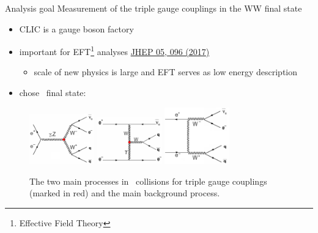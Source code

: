 \documentclass{beamer}
\begin{document}
\begin{frame}{Analysis goal}
Measurement of the triple gauge couplings in the WW final state
\begin{itemize}
%
  \item CLIC is a gauge boson factory
  \item important for EFT\footnote{Effective Field Theory} analyses \href{https://link.springer.com/content/pdf/10.1007/JHEP05(2017)096.pdf}{JHEP 05, 096 (2017)}
  \begin{itemize}
    \item scale of new physics is large and EFT serves as low energy description
  \end{itemize}
  \item chose \qqln\ final state:
%
\end{itemize}

\begin{figure}
\includegraphics[width=0.25\textwidth]{triple_gauge_s_chan.png} \hspace{1em}
\includegraphics[width=0.25\textwidth]{triple_gauge_t_chan.png} \hspace{1em}
\includegraphics[width=0.25\textwidth]{triple_gauge_bkg.png}
\caption{
  The two main processes in \epm\ collisions for triple gauge couplings (marked in red) and the main background process.
}
\end{figure}

\end{frame}
\end{document}
